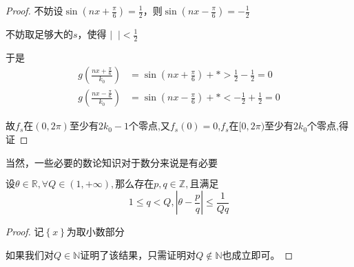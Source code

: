 \documentclass[lang=cn,10pt]{elegantbook}
\begin{document}
\begin{proof}
		不妨设$\sin \left( nx+\frac{\pi}{6} \right) =\frac{1}{2}$，则$\sin \left( nx-\frac{\pi}{6} \right) =-\frac{1}{2}$
		
		不妨取足够大的$s$，使得
		$\left| \mathop {\sum_{j=1}^n{\frac{\left( -1 \right) ^sk_{0}^{2s}A_j}{k_{j}^{2s}}}} \limits_{} \right|<\frac{1}{2}
		$
		
		于是
		\begin{equation*}
		\begin{aligned}
			g\left( \frac{nx+\frac{\pi}{6}}{k_0} \right) &=\sin \left( nx+\frac{\pi}{6} \right) +*>\frac{1}{2}-\frac{1}{2}=0
			\\
			g\left( \frac{nx-\frac{\pi}{6}}{k_0} \right) &=\sin \left( nx-\frac{\pi}{6} \right) +*<-\frac{1}{2}+\frac{1}{2}=0
		\end{aligned}
		\end{equation*}
		
		故$f_{s}$在$(0,2\pi)$至少有$2k_{0}-1$个零点,又$f_{s}(0)=0$,$f_{s}$在$[0,2\pi)$至少有$2k_{0}$个零点,得证
	\end{proof}
	
	当然，一些必要的数论知识对于数分来说是有必要
	\begin{theorem}[狄拉克雷定理]
		$\text{设}\theta \in \mathbb{R} ,\forall Q\in \left( 1,+\infty \right) ,\text{那么存在}p,q\in \mathbb{Z} ,\text{且满足}
		$
		\begin{equation*}
			1\le q<Q,\left| \theta -\frac{p}{q} \right|\le \frac{1}{Qq}
		\end{equation*}
	\end{theorem}
	\begin{proof}
		$\text{记}\left\{ x \right\} \text{为取小数部分}$
		
		如果我们对$Q\in \mathbb{N}$证明了该结果，只需证明对$Q\notin \mathbb{N}$也成立即可。
	\end{proof}
	
\end{document}
